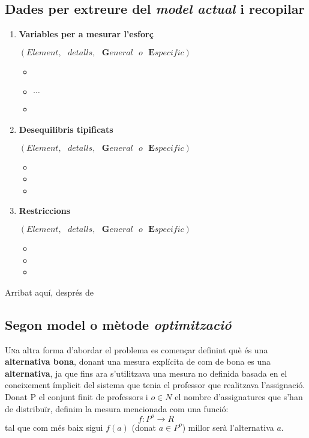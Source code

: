 \documentclass[10pt,twocolumn]{article}
\newcommand{\esp}{\text{ }}
\begin{document}
\subsection{Dades per extreure del \textit{model actual} i recopilar}
\begin{enumerate}
	\item \textbf{Variables per a mesurar l'esforç} 
	
	$(Element,\esp detalls,\esp  \textbf{G}eneral \esp o \esp \textbf{E}specific)$
	\begin{itemize}
		\item 
		\item $\cdots$
		\item 
	\end{itemize}
\item \textbf{Desequilibris tipificats}

	$(Element,\esp detalls,\esp  \textbf{G}eneral \esp o \esp \textbf{E}specific)$
\begin{itemize}
	\item 
	\item 
	\item 
\end{itemize}
\item \textbf{Restriccions}

$(Element,\esp detalls,\esp  \textbf{G}eneral \esp o \esp \textbf{E}specific)$
\begin{itemize}
	\item 
	\item 
	\item 
\end{itemize}
\end{enumerate}
Arribat aquí, després de 
\\
\newpage
\begin{tcolorbox}[colframe=white,colback=redviolet!20,sharp corners=all,size=minimal,halign=center,valign=center]
\section{Segon model o mètode \textit{optimització}}
\end{tcolorbox}
\lettrine{U}na altra forma d'abordar el problema es començar definint què és una \textbf{alternativa bona}, donant una mesura explícita de com de bona es una \textbf{alternativa}, ja que fins ara s'utilitzava una mesura no definida basada en el coneixement ímplicit del sistema que tenia el professor que realitzava l'assignació. Donat P el conjunt finit de professors i $o \in N$ el nombre d'assignatures que s'han de distribuïr, definim la mesura mencionada com una funció:
$$f: P^o \longrightarrow R$$
tal que com més baix sigui $f(a)$ (donat $a \in P^o$) millor serà l'alternativa $a$.
\end{document}
